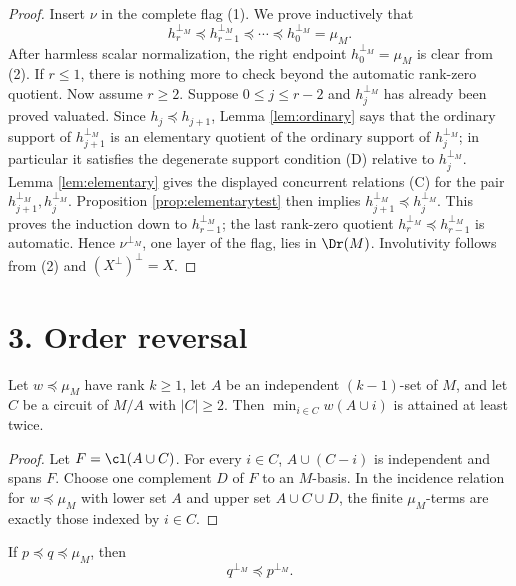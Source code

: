 \begin{proof}
Insert $\nu$ in the complete flag (1).  We prove inductively that
\[
        h_r^{\perp_M}\preceq h_{r-1}^{\perp_M}\preceq\cdots
        \preceq h_0^{\perp_M}=\mu_M .
\]
After harmless scalar normalization, the right endpoint
$h_0^{\perp_M}=\mu_M$ is clear from (2).  If $r\le1$, there is
nothing more to check beyond the automatic rank-zero quotient.  Now assume $r\ge2$.
Suppose $0\le j\le r-2$ and $h_j^{\perp_M}$ has
already been proved valuated.  Since $h_j\preceq h_{j+1}$, Lemma
\ref{lem:ordinary} says that the ordinary support of
$h_{j+1}^{\perp_M}$ is an elementary quotient of the ordinary support of
$h_j^{\perp_M}$; in particular it satisfies the degenerate support
condition (D) relative to $h_j^{\perp_M}$.  Lemma
\ref{lem:elementary} gives the displayed concurrent relations (C) for
the pair $h_{j+1}^{\perp_M},h_j^{\perp_M}$.  Proposition
\ref{prop:elementarytest} then implies
$h_{j+1}^{\perp_M}\preceq h_j^{\perp_M}$.  This proves the induction
down to $h_{r-1}^{\perp_M}$; the last rank-zero quotient
$h_r^{\perp_M}\preceq h_{r-1}^{\perp_M}$ is automatic.  Hence $\nu^{\perp_M}$, one layer of the flag, lies in
$\Dr(M)$.  Involutivity follows from (2) and $(X^\perp)^\perp=X$.
\end{proof}

\section*{3. Order reversal}

\begin{lemma}\label{lem:circuit}
Let $w\preceq\mu_M$ have rank $k\ge1$, let $A$ be an independent
$(k-1)$-set of $M$, and let $C$ be a circuit of $M/A$ with $|C|\ge2$.
Then $\min_{i\in C}w(A\cup i)$ is attained at least twice.
\end{lemma}

\begin{proof}
Let $F=\cl(A\cup C)$.  For every $i\in C$, $A\cup(C-i)$ is independent
and spans $F$.  Choose one complement $D$ of $F$ to an $M$-basis.  In
the incidence relation for $w\preceq\mu_M$ with lower set $A$ and upper
set $A\cup C\cup D$, the finite $\mu_M$-terms are exactly those indexed
by $i\in C$.
\end{proof}

\begin{theorem}\label{thm:order}
If $p\preceq q\preceq\mu_M$, then
\[
        q^{\perp_M}\preceq p^{\perp_M}.
\]
\end{theorem}

